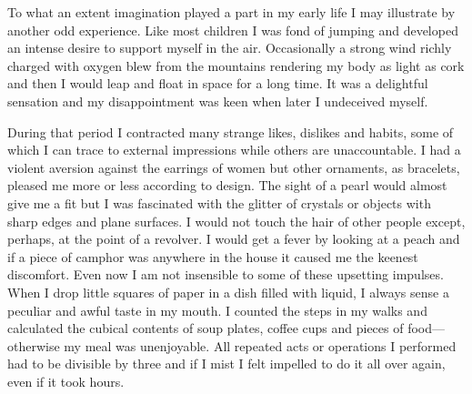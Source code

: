 \documentclass[a4paper,12pt,english,twoside,openright]{memoir}
\begin{document}
	To what an extent imagination played a part in my early life I may illustrate by another odd 
	experience.  Like most children I was fond of jumping and developed an intense desire to support 
	myself in the air.  Occasionally a strong wind richly charged with oxygen blew from the mountains 
	rendering my body as light as cork and then I would leap and float in space for a long time.  It was 
	a delightful sensation and my disappointment was keen when later I undeceived myself.  
	
	During that period I contracted many strange likes, dislikes and habits, some of which I can trace 
	to external impressions while others are unaccountable.  I had a violent aversion against the 
	earrings of women but other ornaments, as bracelets, pleased me more or less according to 
	design.  The sight of a pearl would almost give me a fit but I was fascinated with the glitter of 
	crystals or objects with sharp edges and plane surfaces.  I would not touch the hair of other 
	people except, perhaps, at the point of a revolver.  I would get a fever by looking at a peach and if 
	a piece of camphor was anywhere in the house it caused me the keenest discomfort.  Even now I 
	am not insensible to some of these upsetting impulses.  When I drop little squares of paper in a 
	dish filled with liquid, I always sense a peculiar and awful taste in my mouth.  I counted the steps 
	in my walks and calculated the cubical contents of soup plates, coffee cups and pieces of food—
	otherwise my meal was unenjoyable.  All repeated acts or operations I performed had to be 
	divisible by three and if I mist I felt impelled to do it all over again, even if it took hours.  
	
\end{document}
